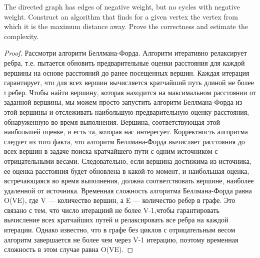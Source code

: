 


\begin{prob}
The directed graph has edges of negative weight, but no cycles with negative weight. Construct an algorithm that finds for a given vertex the vertex from which it is the maximum distance away. Prove the correctness and estimate the complexity.
\end{prob}
\vskip 0.2in
\begin{proof}
Рассмотри алгоритм Беллмана-Форда. Алгоритм итеративно релаксирует ребра, т.е. пытается обновить предварительные оценки расстояния для каждой вершины на основе расстояний до ранее посещенных вершин. Каждая итерация гарантирует, что для всех вершин вычисляется кратчайший путь длиной не более i ребер. Чтобы найти вершину, которая находится на максимальном расстоянии от заданной вершины, мы можем просто запустить алгоритм Беллмана-Форда из этой вершины и отслеживать наибольшую предварительную оценку расстояния, обнаруженную во время выполнения. Вершина, соответствующая этой наибольшей оценке, и есть та, которая нас интересует. Корректность алгоритма следует из того факта, что алгоритм Беллмана-Форда вычисляет расстояния до всех вершин в задаче поиска кратчайшего пути с одним источником с отрицательными весами. Следовательно, если вершина достижима из источника, ее оценка расстояния будет обновлена в какой-то момент, и наибольшая оценка, встречающаяся во время выполнения, должна соответствовать вершине, наиболее удаленной от источника. Временная сложность алгоритма Беллмана-Форда равна O(VE), где V — количество вершин, а E — количество ребер в графе. Это связано с тем, что число итерациий не более V-1,чтобы гарантировать вычисление всех кратчайших путей и релаксировать все ребра на каждой итерации. Однако известно, что в графе без циклов с отрицательным весом алгоритм завершается не более чем через V-1 итерацию, поэтому временная сложность в этом случае равна O(VE).
\end{proof}
\vskip 0.6in

